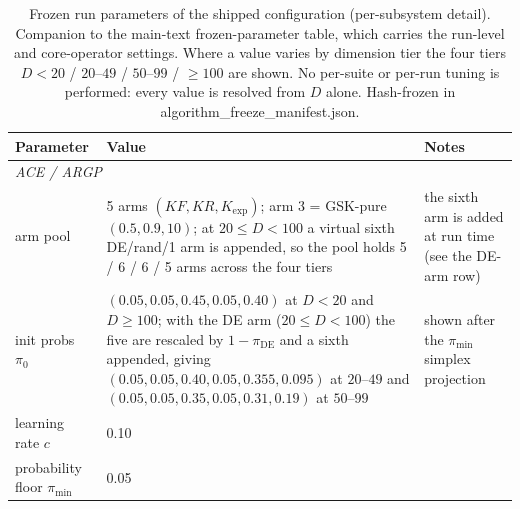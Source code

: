 \begin{table}[H]
\caption{Frozen run parameters of the shipped configuration (per-subsystem
detail). Companion to the main-text frozen-parameter table, which carries the
run-level and core-operator settings. Where a value varies by dimension tier the
four tiers $D{<}20$ / $20$--$49$ / $50$--$99$ / ${\ge}100$ are shown. No
per-suite or per-run tuning is performed: every value is resolved from $D$
alone. Hash-frozen in algorithm\_freeze\_manifest.json.}
\label{tab:parameters-detail}
\centering
\small
\begin{tabular}{p{2.9cm} p{5.8cm} p{4.8cm}}
\toprule
\textbf{Parameter} & \textbf{Value} & \textbf{Notes}\\
\midrule
\multicolumn{3}{l}{\emph{ACE / ARGP}}\\
\midrule
arm pool & 5 arms $(KF,KR,K_{\exp})$; arm 3 = GSK-pure $(0.5,0.9,10)$; at $20{\le}D{<}100$ a virtual sixth DE/rand/1 arm is appended, so the pool holds 5 / 6 / 6 / 5 arms across the four tiers & the sixth arm is added at run time (see the DE-arm row)\\
init probs $\pi_0$ & $(0.05,0.05,0.45,0.05,0.40)$ at $D{<}20$ and $D{\ge}100$; with the DE arm ($20{\le}D{<}100$) the five are rescaled by $1-\pi_{\mathrm{DE}}$ and a sixth appended, giving $(0.05,0.05,0.40,0.05,0.355,0.095)$ at $20$--$49$ and $(0.05,0.05,0.35,0.05,0.31,0.19)$ at $50$--$99$ & shown after the $\pi_{\min}$ simplex projection\\
learning rate $c$ & 0.10 & \\
probability floor $\pi_{\min}$ & 0.05 & \\

\end{tabular}
\end{table}
